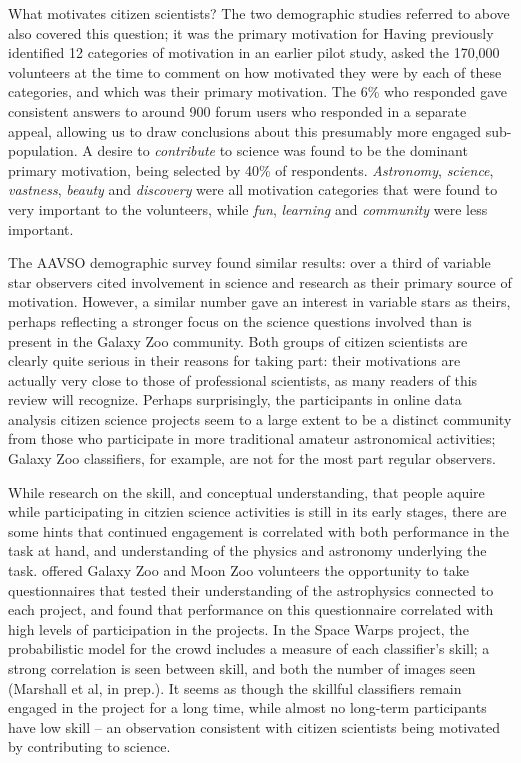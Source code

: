 \documentclass{ar2e}
\begin{document}
What motivates citizen scientists? The two demographic studies referred to
above also covered this question; it was the primary motivation for
\citeauthor{Rad++2013} Having previously \citep{Rad++2010} identified 12
categories of motivation in an earlier pilot study, \citet{Rad++2013} asked
the 170,000 volunteers at the time to comment on how motivated they were by
each of these categories, and which was their primary motivation. The 6\% who
responded gave consistent answers to around 900 forum users who responded in a
separate appeal, allowing us to draw conclusions about this presumably more
engaged sub-population. A desire to {\it contribute} to science was found to
be the dominant primary motivation, being selected by 40\% of respondents.
{\it Astronomy}, {\it science}, {\it vastness}, {\it beauty} and  {\it
discovery} were all motivation categories that were found to very important to
the volunteers, while {\it fun}, {\it learning} and {\it community} were less
important. 

The AAVSO demographic survey \citep{P+P2012} found similar results: over a third
of variable star observers cited involvement in science and research as their
primary source of motivation. However, a similar number gave an interest in
variable stars as theirs, perhaps reflecting a stronger focus on the science
questions involved than is present in the Galaxy Zoo community. Both groups of
citizen scientists are clearly quite serious in their reasons for taking part:
their motivations are actually very close to those of professional scientists,
as many readers of this review will recognize. Perhaps surprisingly, the
participants in online data analysis citizen science projects seem to a large
extent to be a distinct community from those who participate in more traditional
amateur astronomical activities; Galaxy Zoo classifiers, for example, are not
for the most part regular observers. 

While research on the skill, and conceptual understanding, that  people aquire
while participating in citzien science activities is still in its early
stages, there are some hints that continued engagement is correlated with both
performance in the task at hand, and understanding of the physics and
astronomy underlying the task. \citet{Prather++2013} offered Galaxy Zoo and
Moon Zoo volunteers the opportunity to take questionnaires that tested their
understanding of the astrophysics connected to each project, and found that
performance on this questionnaire correlated with high levels of participation
in the projects. In the Space Warps project, the probabilistic model for the
crowd includes a measure of each classifier's skill; a strong correlation is
seen between skill, and both the number of images seen (Marshall et al, in
prep.). It seems as though the skillful classifiers remain engaged in the
project for a long time, while almost no long-term participants have low skill
-- an observation consistent with citizen scientists being motivated by
contributing to science.
\end{document}
